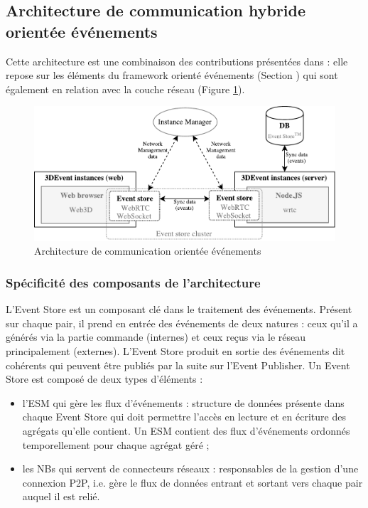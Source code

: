 \subsection{Architecture de communication hybride \og orientée 
événements\fg{}}
\label{sec:comm_event}

Cette architecture est une combinaison des contributions présentées dans 
\cite{Desprat2016,Desprat2017} : elle repose sur les éléments du 
framework orienté événements (Section ) qui sont également 
en relation avec la couche réseau (Figure \ref{fig:archievent}).
\begin{figure}[]
	\centering
	\includegraphics[width=\columnwidth]{eps/archi.pdf}
	\caption{Architecture de communication \og orientée événements\fg{}}
	\label{fig:archievent}
\end{figure}

\subsubsection{Spécificité des composants de l'architecture}
L'Event Store est un composant clé dans le traitement des événements. Présent 
sur chaque pair, il prend en entrée des événements de deux natures : ceux qu'il a 
générés via la partie commande (internes) et ceux reçus via le réseau 
principalement (externes). 
L'Event Store produit en sortie des événements dit \og 
cohérents\fg{} qui peuvent être publiés par la suite sur l'Event Publisher.
Un Event Store est composé de deux types d'éléments : 
\begin{itemize}
	\item l'\gls{ESM} qui gère les flux d'événements : structure de données 
	présente dans chaque Event Store qui doit permettre l'accès en lecture et en 
	écriture des agrégats qu'elle contient. 
	Un \gls{ESM} contient des flux d'événements ordonnés temporellement 
	pour chaque agrégat géré ;
	\item les \glspl{NB} qui servent de connecteurs réseaux : responsables de la 
	gestion d'une connexion \gls{P2P}, i.e. gère le flux de données entrant et 
	sortant vers chaque pair auquel il est relié.
\end{itemize}

